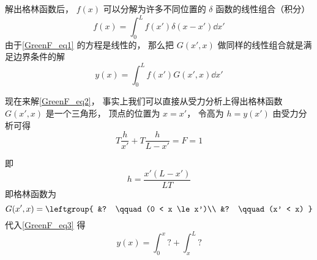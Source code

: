 解出格林函数后， $f(x)$ 可以分解为许多不同位置的 $\delta$ 函数的线性组合（积分）
\begin{equation}
f(x) = \int_0^L f(x') \delta(x - x') \dd{x'}
\end{equation}
由于\autoref{GreenF_eq1} 的方程是线性的， 那么把 $G(x', x)$ 做同样的线性组合就是满足边界条件的解
\begin{equation}\label{GreenF_eq3}
y(x) = \int_0^L f(x') G(x', x) \dd{x'}
\end{equation}

现在来解\autoref{GreenF_eq2}， 事实上我们可以直接从受力分析上得出格林函数 $G(x', x)$ 是一个三角形， 顶点的位置为 $x = x'$， 令高为 $h = y(x')$ 由受力分析可得
\begin{equation}
T\frac{h}{x'} + T\frac{h}{L - x'} = F = 1
\end{equation}

即
\begin{equation}
h = \frac{x' (L - x')}{LT}
\end{equation}
即格林函数为
\begin{equation}
G(x', x) = \leftgroup{
&? \qquad (0 < x \le x')\\
&? \qquad (x' < x)
}\end{equation}
代入\autoref{GreenF_eq3} 得
\begin{equation}
y(x) = \int_0^x ? + \int_x^L ?
\end{equation}
